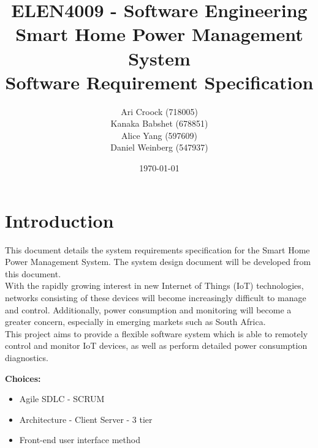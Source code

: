 \documentclass[11pt, a4paper]{article}
\title{ELEN4009 - Software Engineering\\Smart Home Power Management System\\Software Requirement Specification}
\author{Ari Croock (718005)\\Kanaka Babshet (678851)\\Alice Yang (597609)\\Daniel Weinberg (547937)}
\date{\today}
\begin{document}
	\maketitle
	\section{Introduction}
	
	This document details the system requirements specification for the Smart Home Power Management System. The system design document will be developed from this document.\\
	
	With the rapidly growing interest in new Internet of Things (IoT) technologies, networks consisting of these devices will become increasingly difficult to manage and control. Additionally, power consumption and monitoring will become a greater concern, especially in emerging markets such as South Africa.\\
	
	This project aims to provide a flexible software system which is able to remotely control and monitor IoT devices, as well as perform detailed power consumption diagnostics.
	
	\textbf{Choices:} 
	\begin{itemize}
		\item Agile SDLC - SCRUM 
		\item Architecture - Client Server - 3 tier
		\item Front-end user interface method
	\end{itemize}
	
	
	
	
	
	
	
\end{document}
